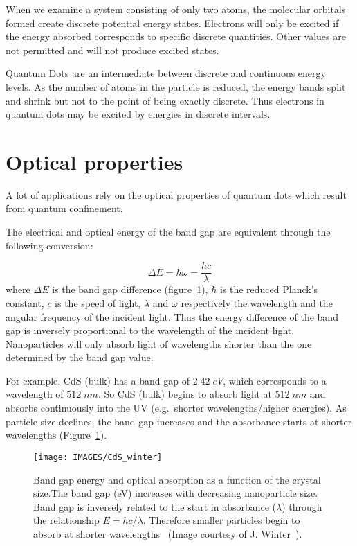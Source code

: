 When we examine a system consisting of only two atoms, the molecular orbitals formed create discrete potential energy states. Electrons will only be excited if the energy absorbed corresponds to specific discrete quantities. Other values are not permitted and will not produce excited states.

Quantum Dots are an intermediate between discrete and continuous energy levels. As the number of atoms in the particle is reduced, the energy bands split and shrink but not to the point of being exactly discrete. Thus electrons in quantum dots may be excited by energies in discrete intervals.

\section{Optical properties}
A lot of applications rely on the optical properties of quantum dots which result from quantum confinement.

The electrical and optical energy of the band gap are equivalent through the following conversion:

\begin{equation}
\Delta E = \hbar \omega = \frac{h c}{\lambda}
\end{equation}
where $\Delta E$ is the band gap difference (figure~\ref{fig:CdS}), $\hbar$ is the reduced Planck's constant, $c$ is the speed of light, $\lambda$ and $\omega$ respectively the wavelength and the angular frequency of the incident light. Thus the energy difference of the band gap is inversely proportional to the wavelength of the incident light. Nanoparticles will only absorb light of wavelengths shorter than the one determined by the band gap value.

For example, CdS (bulk) has a band gap of $2.42 \; eV$, which corresponds to a wavelength of $512 \; nm$. So CdS (bulk) begins to absorb light at $512 \; nm$ and absorbs continuously into the UV (e.g.\ shorter wavelengths/higher energies). As particle size declines, the band gap increases and the absorbance starts at shorter wavelengths (Figure~\ref{fig:CdS}).

\begin{figure} 
 \centering
 \texttt{[image: IMAGES/CdS\_winter]}
 \caption{Band gap energy and optical absorption as a function of the crystal size.\newline The band gap (eV) increases with decreasing nanoparticle size. Band gap is inversely related to the start in absorbance ($\lambda$) through the relationship $E=hc/\lambda$. Therefore smaller particles begin to absorb at shorter wavelengths~\cite{Weller1986} (Image courtesy of J. Winter~\cite{Winter2004}).}
 \label{fig:CdS}
\end{figure}

